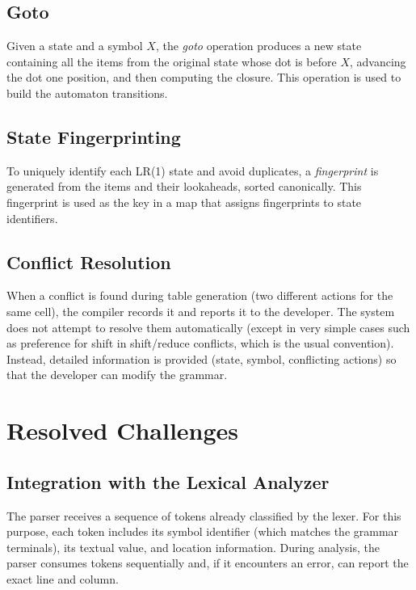 \documentclass[12pt,a4paper]{report}
\begin{document}
\subsection{Goto}

Given a state and a symbol $X$, the \textit{goto} operation
produces a new state containing all the items from the original state whose dot is before $X$, 
advancing the dot one position, and then computing the closure.
This operation is used to build the automaton transitions.

\subsection{State Fingerprinting}

To uniquely identify each LR(1) state and avoid duplicates, a \textit{fingerprint}
 is generated from the items and their lookaheads, sorted canonically.
This fingerprint is used as the key in a map that assigns fingerprints to state identifiers.

\subsection{Conflict Resolution}

When a conflict is found during table generation (two different actions for the same cell), 
the compiler records it and reports it to the developer.
The system does not attempt to resolve them automatically (except in very simple cases such as preference for shift in shift/reduce conflicts,
 which is the usual convention).
Instead, detailed information is provided (state, symbol, conflicting actions) so that the developer can modify the grammar.

\section{Resolved Challenges}

\subsection{Integration with the Lexical Analyzer}
The parser receives a sequence of tokens already classified by the lexer.
For this purpose, each token includes its symbol identifier (which matches the grammar terminals), its textual value, and location information.
During analysis, the parser consumes tokens sequentially and, if it encounters an error, can report the exact line and column.
\end{document}
